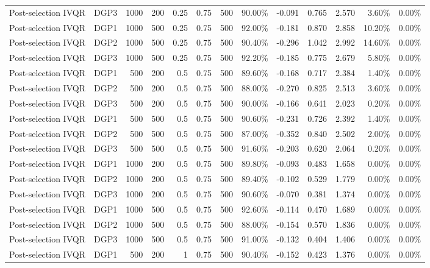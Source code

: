 \begin{landscape}
\begin{longtable}{llrrrrrrrrrrr}
Post-selection IVQR & DGP3 & 1000 & 200 & 0.25 & 0.75 & 500 & 90.00\% & -0.091 & 0.765 & 2.570 & 3.60\% & 0.00\% \\
Post-selection IVQR & DGP1 & 1000 & 500 & 0.25 & 0.75 & 500 & 92.00\% & -0.181 & 0.870 & 2.858 & 10.20\% & 0.00\% \\
Post-selection IVQR & DGP2 & 1000 & 500 & 0.25 & 0.75 & 500 & 90.40\% & -0.296 & 1.042 & 2.992 & 14.60\% & 0.00\% \\
Post-selection IVQR & DGP3 & 1000 & 500 & 0.25 & 0.75 & 500 & 92.20\% & -0.185 & 0.775 & 2.679 & 5.80\% & 0.00\% \\
Post-selection IVQR & DGP1 & 500 & 200 & 0.5 & 0.75 & 500 & 89.60\% & -0.168 & 0.717 & 2.384 & 1.40\% & 0.00\% \\
Post-selection IVQR & DGP2 & 500 & 200 & 0.5 & 0.75 & 500 & 88.00\% & -0.270 & 0.825 & 2.513 & 3.60\% & 0.00\% \\
Post-selection IVQR & DGP3 & 500 & 200 & 0.5 & 0.75 & 500 & 90.00\% & -0.166 & 0.641 & 2.023 & 0.20\% & 0.00\% \\
Post-selection IVQR & DGP1 & 500 & 500 & 0.5 & 0.75 & 500 & 90.60\% & -0.231 & 0.726 & 2.392 & 1.40\% & 0.00\% \\
Post-selection IVQR & DGP2 & 500 & 500 & 0.5 & 0.75 & 500 & 87.00\% & -0.352 & 0.840 & 2.502 & 2.00\% & 0.00\% \\
Post-selection IVQR & DGP3 & 500 & 500 & 0.5 & 0.75 & 500 & 91.60\% & -0.203 & 0.620 & 2.064 & 0.20\% & 0.00\% \\
Post-selection IVQR & DGP1 & 1000 & 200 & 0.5 & 0.75 & 500 & 89.80\% & -0.093 & 0.483 & 1.658 & 0.00\% & 0.00\% \\
Post-selection IVQR & DGP2 & 1000 & 200 & 0.5 & 0.75 & 500 & 89.40\% & -0.102 & 0.529 & 1.779 & 0.00\% & 0.00\% \\
Post-selection IVQR & DGP3 & 1000 & 200 & 0.5 & 0.75 & 500 & 90.60\% & -0.070 & 0.381 & 1.374 & 0.00\% & 0.00\% \\
Post-selection IVQR & DGP1 & 1000 & 500 & 0.5 & 0.75 & 500 & 92.60\% & -0.114 & 0.470 & 1.689 & 0.00\% & 0.00\% \\
Post-selection IVQR & DGP2 & 1000 & 500 & 0.5 & 0.75 & 500 & 88.00\% & -0.154 & 0.570 & 1.836 & 0.00\% & 0.00\% \\
Post-selection IVQR & DGP3 & 1000 & 500 & 0.5 & 0.75 & 500 & 91.00\% & -0.132 & 0.404 & 1.406 & 0.00\% & 0.00\% \\
Post-selection IVQR & DGP1 & 500 & 200 & 1 & 0.75 & 500 & 90.40\% & -0.152 & 0.423 & 1.376 & 0.00\% & 0.00\% \\

\end{longtable}
\end{landscape}
